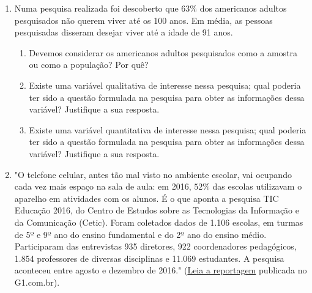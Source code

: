 {\begin{enumerate}
\begin{enumerate}
\item {} 
Os indivíduos são classificados como abaixo do peso, normais ou acima do peso e suas pressões sanguíneas são registradas.

\item {} 
Os indivíduos são classificados como tendo pressão alta, normal ou baixa e seus pesos são registrados.

\item {} 
Os indivíduos são classificados como abaixo do peso, normais ou acima do peso e como tendo pressão alta, normal ou baixa.

\end{enumerate}

\item Numa pesquisa realizada foi descoberto que $63\%$ dos americanos adultos pesquisados não querem viver até os 100 anos. Em média, as pessoas pesquisadas disseram desejar viver até a idade de 91 anos.
\begin{enumerate}
\item {} 
Devemos considerar os americanos adultos pesquisados como a amostra ou como a população? Por quê?

\item {} 
Existe uma variável qualitativa de interesse nessa pesquisa; qual poderia ter sido a questão formulada na pesquisa para obter as informações dessa variável? Justifique a sua resposta.

\item {} 
Existe uma variável quantitativa de interesse nessa pesquisa; qual poderia ter sido a questão formulada na pesquisa para obter as informações dessa variável? Justifique a sua resposta.

\end{enumerate}

\item "O telefone celular, antes tão mal visto no ambiente escolar, vai ocupando cada vez mais espaço na sala de aula: em 2016, $52\%$ das escolas utilizavam o aparelho em atividades com os alunos. É o que aponta a pesquisa TIC Educação 2016, do Centro de Estudos sobre as Tecnologias da Informação e da Comunicação (Cetic).
Foram coletados dados de 1.106 escolas, em turmas de 5º e 9º ano do ensino fundamental e do 2º ano do ensino médio. Participaram das entrevistas 935 diretores, 922 coordenadores pedagógicos, 1.854 professores de diversas disciplinas e 11.069 estudantes. A pesquisa aconteceu entre agosto e dezembro de 2016." (\href{https://g1.globo.com/educacao/notici/52-das-instituicoes-de-educacao-basica-usam-celular-em-atividades-escolares-aponta-estudo-da-cetic.gtml}{Leia a reportagem} publicada no G1.com.br).


\end{enumerate}}
